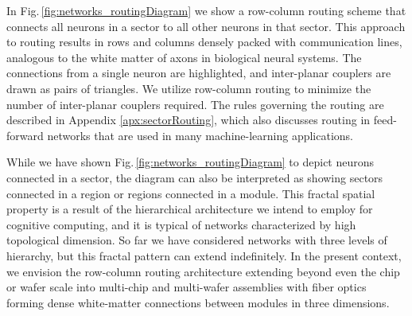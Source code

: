 \documentclass[aip,amsmath,amssymb,reprint,nofootinbib]{revtex4-1}
\begin{document}
In Fig.\,\ref{fig:networks_routingDiagram} we show a row-column routing scheme that connects all neurons in a sector to all other neurons in that sector. This approach to routing results in rows and columns densely packed with communication lines, analogous to the white matter of axons in biological neural systems. The connections from a single neuron are highlighted, and inter-planar couplers are drawn as pairs of triangles. We utilize row-column routing to minimize the number of inter-planar couplers required. The rules governing the routing are described in Appendix \ref{apx:sectorRouting}, which also discusses routing in feed-forward networks that are used in many machine-learning applications.

While we have shown Fig.\,\ref{fig:networks_routingDiagram} to depict neurons connected in a sector, the diagram can also be interpreted as showing sectors connected in a region or regions connected in a module. This fractal spatial property is a result of the hierarchical architecture we intend to employ for cognitive computing, and it is typical of networks characterized by high topological dimension. So far we have considered networks with three levels of hierarchy, but this fractal pattern can extend indefinitely. In the present context, we envision the row-column routing architecture extending beyond even the chip or wafer scale into multi-chip and multi-wafer assemblies with fiber optics forming dense white-matter connections between modules in three dimensions. 
\end{document}
